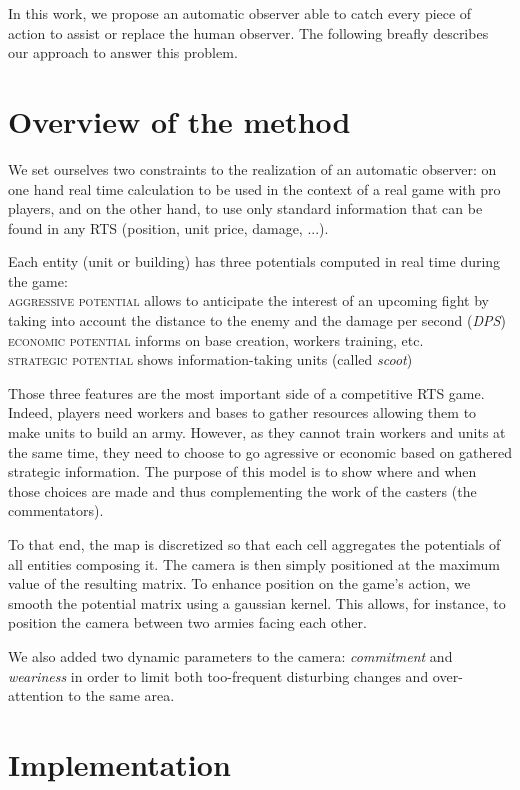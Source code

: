 \documentclass{jfsma}
\begin{document}
        In this work, we propose an automatic observer able to catch every piece of action to assist or replace the human observer. The following breafly describes our approach to answer this problem.
        
\section{Overview of the method}
We set ourselves two constraints to the realization of an automatic observer: on one hand real time calculation to be used in the context of a real game with pro players, and on the other hand, to use only standard information that can be found in any RTS (position, unit price, damage, ...).

Each entity (unit or building) has three potentials computed in real time during the game:\\
\textsc{aggressive potential} allows to anticipate the interest of an upcoming fight by taking into account the distance to the enemy and the damage per second (\emph{DPS})\\
\textsc{economic potential} informs on base creation, workers training, etc.\\
\textsc{strategic potential} shows information-taking units (called \emph{scoot}) 

Those three features are the most important side of a competitive RTS game.
Indeed, players need workers and bases to gather resources allowing them to make units to build an army.
However, as they cannot train workers and units at the same time, they need to choose to go agressive or economic based on gathered strategic information.
The purpose of this model is to show where and when those choices are made and thus complementing the work of the casters (the commentators).

To that end, the map is discretized so that each cell aggregates the potentials of all entities composing it. 
The camera is then simply positioned at the maximum value of the resulting matrix.
To enhance position on the game's action, we smooth the potential matrix using a gaussian kernel. 
This allows, for instance, to position the camera between two armies facing each other. 

We also added two dynamic parameters to the camera: \emph{commitment} and \emph{weariness} in order to limit both too-frequent disturbing changes and over-attention to the same area.

\section{Implementation}
\end{document}
